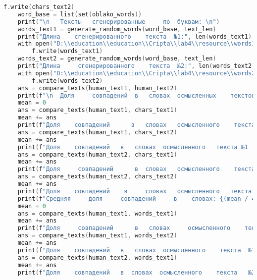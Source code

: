 \begin{lstlisting}[language=C]
        f.write(chars_text2)
    word_base = list(set(oblako_words))
    print("\n	Тексты	 сгенерированные	 по	 буквам: \n")
    words_text1 = generate_random_words(word_base, text_len)
    print("Длина 	сгенерированного 	текста 	№1:", len(words_text1))
    with open("D:\\education\\education\\Cripta\\lab4\\resource\\words1.txt", 'w') as f:
        f.write(words_text1)
    words_text2 = generate_random_words(word_base, text_len)
    print("Длина	 сгенерированного	 текста	 №2:", len(words_text2))
    with open("D:\\education\\education\\Cripta\\lab4\\resource\\words2.txt", 'w') as f:
        f.write(words_text2)
    ans = compare_texts(human_text1, human_text2)
    print(f"\n	Доля	 совпадений	 в	 словах	 осмысленных 	текстов: {ans * 100:.2f}\% \n")
    mean = 0
    ans = compare_texts(human_text1, chars_text1)
    mean += ans
    print(f"Доля 	совпадений  	в 	словах	 осмысленного	 текста	 №1	 и	 сгенерированного	 из	 букв 	текста №1: {ans * 100:.2f}\%")
    ans = compare_texts(human_text1, chars_text2)
    mean += ans
    print(f"Доля 	совпадений 	 в	 словах	 осмысленного 	текста №1	 и 	сгенерированного 	из	 букв	 текста	 №2: {ans * 100:.2f}\%")
    ans = compare_texts(human_text2, chars_text1)
    mean += ans
    print(f"Доля	 совпадений 	 в 	словах	 осмысленного	 текста	 №2	 и 	сгенерированного	 из	 букв	 текста	 №1: {ans * 100:.2f}\%")
    ans = compare_texts(human_text2, chars_text2)
    mean += ans
    print(f"Доля 	совпадений	  в 	словах	 осмысленного 	текста 	№2	 и	 сгенерированного	 из	 букв 	текста 	№2: {ans * 100:.2f}\%")
    print(f"Средняя 	доля	 совпадений 	в	 словах: {(mean / 4) * 100:.2f}\% \n")
    mean = 0
    ans = compare_texts(human_text1, words_text1)
    mean += ans
    print(f"Доля	 совпадений 	 в	 словах 	осмысленного 	текста	 №1	  и	 сгенерированного	 из 	слов	 текста	 №1: {ans * 100:.2f}\%")
    ans = compare_texts(human_text1, words_text2)
    mean += ans
    print(f"Доля 	совпадений	 в	 словах	 осмысленного	 текста	 №1 	 и 	сгенерированного	 из	 слов	 текста	 №2: {ans * 100:.2f}\%")
    ans = compare_texts(human_text2, words_text1)
    mean += ans
    print(f"Доля 	совпадений	 в 	словах 	осмысленного 	текста	 №2 	 и	 сгенерированного 	из	 слов	 текста	 №1: {ans * 100:.2f}\%")

\end{lstlisting}
